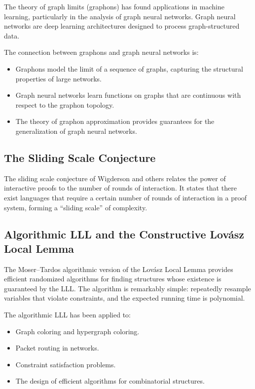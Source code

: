The theory of graph limits (graphons) has found applications in machine learning, particularly in the analysis of graph neural networks. Graph neural networks are deep learning architectures designed to process graph-structured data.

The connection between graphons and graph neural networks is:
\begin{itemize}
\item Graphons model the limit of a sequence of graphs, capturing the structural properties of large networks.
\item Graph neural networks learn functions on graphs that are continuous with respect to the graphon topology.
\item The theory of graphon approximation provides guarantees for the generalization of graph neural networks.
\end{itemize}

\subsection{The Sliding Scale Conjecture}

The sliding scale conjecture of Wigderson and others relates the power of interactive proofs to the number of rounds of interaction. It states that there exist languages that require a certain number of rounds of interaction in a proof system, forming a ``sliding scale'' of complexity.

\subsection{Algorithmic LLL and the Constructive Lov\'asz Local Lemma}

The Moser--Tardos algorithmic version of the Lov\'asz Local Lemma provides efficient randomized algorithms for finding structures whose existence is guaranteed by the LLL. The algorithm is remarkably simple: repeatedly resample variables that violate constraints, and the expected running time is polynomial.

The algorithmic LLL has been applied to:
\begin{itemize}
\item Graph coloring and hypergraph coloring.
\item Packet routing in networks.
\item Constraint satisfaction problems.
\item The design of efficient algorithms for combinatorial structures.
\end{itemize}

